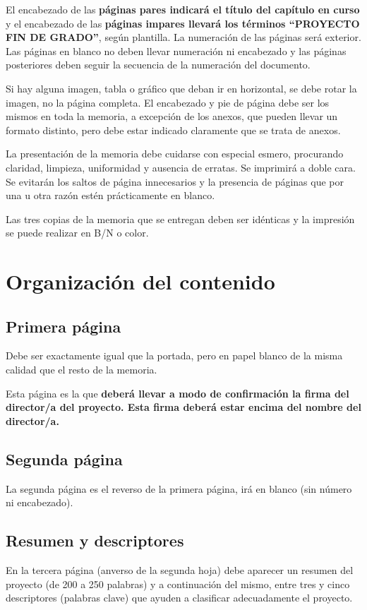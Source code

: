 El encabezado de las \textbf{páginas pares indicará el título del capítulo en curso} y el encabezado de las
\textbf{páginas impares llevará los términos \enquote{PROYECTO FIN DE GRADO}}, según plantilla. La numeración
de las páginas será exterior. Las páginas en blanco no deben llevar numeración ni encabezado y las
páginas posteriores deben seguir la secuencia de la numeración del documento.

Si hay alguna imagen, tabla o gráfico que deban ir en horizontal, se debe rotar la imagen, no la
página completa. El encabezado y pie de página debe ser los mismos en toda la memoria, a
excepción de los anexos, que pueden llevar un formato distinto, pero debe estar indicado
claramente que se trata de anexos.

La presentación de la memoria debe cuidarse con especial esmero, procurando claridad, limpieza,
uniformidad y ausencia de erratas. Se imprimirá a doble cara. Se evitarán los saltos de página
innecesarios y la presencia de páginas que por una u otra razón estén prácticamente en blanco.

Las tres copias de la memoria que se entregan deben ser idénticas y la impresión se puede realizar
en B/N o color.

\section{Organización del contenido}
\subsection{Primera página}
Debe ser exactamente igual que la portada, pero en papel blanco de la misma calidad que el
resto de la memoria.

Esta página es la que \textbf{deberá llevar a modo de confirmación la firma del director/a del
proyecto. Esta firma deberá estar encima del nombre del director/a.}

\subsection{Segunda página}
La segunda página es el reverso de la primera página, irá en blanco (sin número ni encabezado).

\subsection{Resumen y descriptores}
En la tercera página (anverso de la segunda hoja) debe aparecer un resumen del proyecto (de
200 a 250 palabras) y a continuación del mismo, entre tres y cinco descriptores (palabras clave)
que ayuden a clasificar adecuadamente el proyecto.

